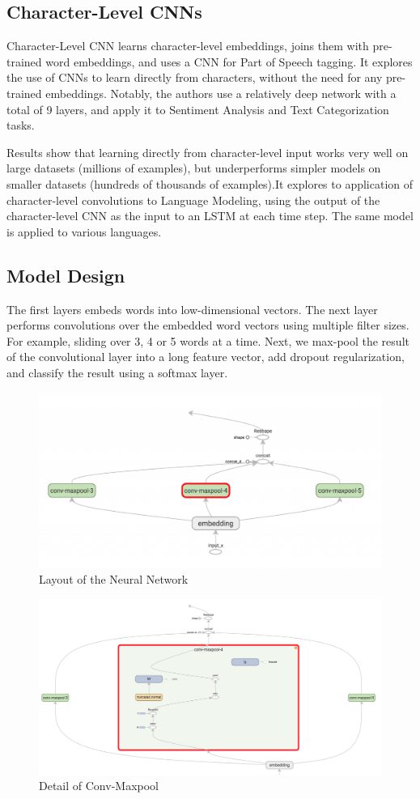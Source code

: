 \documentclass{article}
\begin{document}
\subsection{Character-Level CNNs}

\quad Character-Level CNN learns character-level embeddings, joins them with pre-trained word embeddings, and uses a CNN for Part of Speech tagging.  It explores the use of CNNs to learn directly from characters, without the need for any pre-trained embeddings. Notably, the authors use a relatively deep network with a total of 9 layers, and apply it to Sentiment Analysis and Text Categorization tasks. 

Results show that learning directly from character-level input works very well on large datasets (millions of examples), but underperforms simpler models on smaller datasets (hundreds of thousands of examples).It explores to application of character-level convolutions to Language Modeling, using the output of the character-level CNN as the input to an LSTM at each time step. The same model is applied to various languages.


\subsection{Model Design}
\quad The first layers embeds words into low-dimensional vectors. The next layer performs convolutions over the embedded word vectors using multiple filter sizes. For example, sliding over 3, 4 or 5 words at a time. Next, we max-pool the result of the convolutional layer into a long feature vector, add dropout regularization, and classify the result using a softmax layer.

\begin{figure}[H]
\centering
\includegraphics[width=.4\textwidth]{2.png}
\caption{Layout of the Neural Network}
\end{figure}


\begin{figure}[H]
\centering
\includegraphics[width=.4\textwidth]{AM.png}
\caption{Detail of Conv-Maxpool}
\end{figure}
\end{document}
